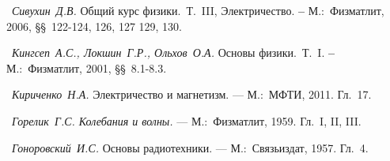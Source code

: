 

\begin{lab:literature}
	\item~\emph{Сивухин~Д.В.} Общий курс физики.~Т.~III, Электричество.
\textbf{--} М.:~Физматлит, 2006, \S\S~122-124, 126, 127 129, 130.
	\item~\emph{Кингсеп~А.С., Локшин~Г.Р., Ольхов~О.А.} Основы физики.~Т.~I.
\textbf{--} М.:~Физматлит, 2001, \S\S~8.1-8.3.
	\item~\emph{Кириченко~Н.А.} Электричество и магнетизм. --- М.:~МФТИ,
2011. Гл.~17.
	\item~\emph{Горелик~Г.С. Колебания и волны.} --- М.:~Физматлит,
1959. Гл.~I, II, III.
	\item~\emph{Гоноровский~И.С.} Основы радиотехники. --- М.:~Связьиздат, 1957. Гл.~4.
\end{lab:literature}
